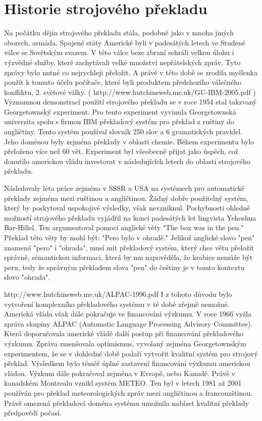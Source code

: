 \documentclass[12pt,a4paper]{report}
\begin{document}
\section{Historie strojového překladu}

Na počátku dějin strojového překladu stála, podobně jako v mnoha jiných oborech, armáda. Spojené státy Americké byli v padesátých letech ve Studené válce se Sovětským svazem. V této válce beze zbraní sehráli velkou úlohu i výzvědné služby, které zachytávali velké množství nepřátelských zpráv. Tyto zprávy bylo nutné co nejrychleji přeložit. A právě v této době se zrodila myšlenka použít k tomuto účelu počítače, které byli produktem předchozího válečného konfliktu, 2. světové války. ( http://www.hutchinsweb.me.uk/GU-IBM-2005.pdf ) Významnou demonstrací použití strojového překladu se v roce 1954 stal takzvaný Georgetownský experiment. Pro tento experiment vyvinula Georgetownská univerzita spolu s firmou IBM překladový systém pro překlad z ruštiny do angličtiny. Tento systém používal slovník 250 slov a 6 gramatických pravidel. Jeho doménou byly zejména překlady v oblasti chemie. Během experimentu bylo přeloženo více než 60 vět. Experiment byl všeobecně přijat jako úspěch, což donutilo americkou vládu investovat v následujících letech do oblasti strojového překladu.

Následovaly léta práce zejména v SSSR a USA na systémech pro automatické překlady zejména mezi ruštinou a angličtinou. Žádný dobře použitelný systém, který by poskytoval uspokojivé výsledky, však nevzniknul. Pochybnosti ohledně možností strojového překladu vyjádřil na konci padesátých let lingvista Yehoshua Bar-Hillel. Ten argumentoval pomocí anglické věty "The box was in the pen." Překlad této věty by mohl být: "Pero bylo v ohradě." Jelikož anglické slovo "pen" znamená "pero" i "ohrada", musí mít překladový systém, který chce větu přeložit správně, sémantickou informaci, která by mu napověděla, že krabice nemůže být peru, tedy že správným překladem slova "pen" do češtiny je v tomto kontextu slovo "ohrada".

http://www.hutchinsweb.me.uk/ALPAC-1996.pdf
I z tohoto důvodu bylo vytvoření komplexního překladového systému v té době zřejmě nemožné. Americká vláda však dále pokračuje ve financování výzkumu. V roce 1966 vyšla zpráva skupiny ALPAC (Automatic Language Processing Advisory Committee). Která doporučovala americké vládě další postup při financování překladového výzkumu. Zpráva zmenšovala optimismus, vyvolaný zejména Georgetownským experimentem, že se v dohledné době podaří vytvořit kvalitní systém pro strojový překlad. Výsledkem bylo téměř úplné zastavení financování výzkumu americkou vládou. Výzkum dále pokračoval zejména v Evropě, nebo Kanadě. Právě v kanadském Montrealu vznikl systém METEO. Ten byl v letech 1981 až 2001 používán pro překlad meteorologických zpráv mezi angličtinou a francouzštinou. Právě omezená překladová doména systému umožnila nabízet kvalitní překlady předpovědí počasí.
\end{document}
